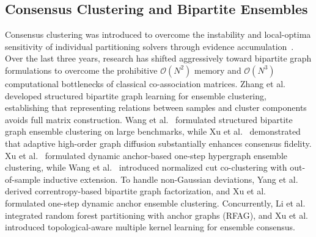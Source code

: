 \documentclass[preprint,12pt]{elsarticle}
\begin{document}
\subsection{Consensus Clustering and Bipartite Ensembles}
Consensus clustering was introduced to overcome the instability and local-optima sensitivity of individual partitioning solvers through evidence accumulation~\cite{monti2003consensus,fred2005combining}. Over the last three years, research has shifted aggressively toward bipartite graph formulations to overcome the prohibitive $\mathcal{O}(N^2)$ memory and $\mathcal{O}(N^3)$ computational bottlenecks of classical co-association matrices. Zhang et al.~\cite{zhang2025structured} developed structured bipartite graph learning for ensemble clustering, establishing that representing relations between samples and cluster components avoids full matrix construction. Wang et al.~\cite{wang2024structured} formulated structured bipartite graph ensemble clustering on large benchmarks, while Xu et al.~\cite{xu2024enhancing} demonstrated that adaptive high-order graph diffusion substantially enhances consensus fidelity. Xu et al.~\cite{xu2025dynamic,xu2026dynamic} formulated dynamic anchor-based one-step hypergraph ensemble clustering, while Wang et al.~\cite{wang2026normalized} introduced normalized cut co-clustering with out-of-sample inductive extension. To handle non-Gaussian deviations, Yang et al.~\cite{yang2025correntropy} derived correntropy-based bipartite graph factorization, and Xu et al.~\cite{xu2026range} formulated one-step dynamic anchor ensemble clustering. Concurrently, Li et al.~\cite{li2026rfag} integrated random forest partitioning with anchor graphs (RFAG), and Xu et al.~\cite{xu2026topological} introduced topological-aware multiple kernel learning for ensemble consensus.
\end{document}
